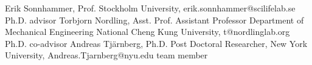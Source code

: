 

\begin{cvhonors}
\cvhonor
{Erik Sonnhammer, Prof. } %
{Stockholm University, 
erik.sonnhammer@scilifelab.se
} %
{Ph.D. advisor} %
{} %
\cvhonor
{Torbjorn Nordling, Asst. Prof. } %
{Assistant Professor Department of Mechanical Engineering 
National Cheng Kung University, 
t@nordlinglab.org
} %
{Ph.D. co-advisor} %
{} %
\cvhonor
{Andreas Tj{\"a}rnberg, Ph.D. } %
{Post Doctoral Researcher, New York University, 
Andreas.Tjarnberg@nyu.edu
} %
{team member} %
{} %







\end{cvhonors}